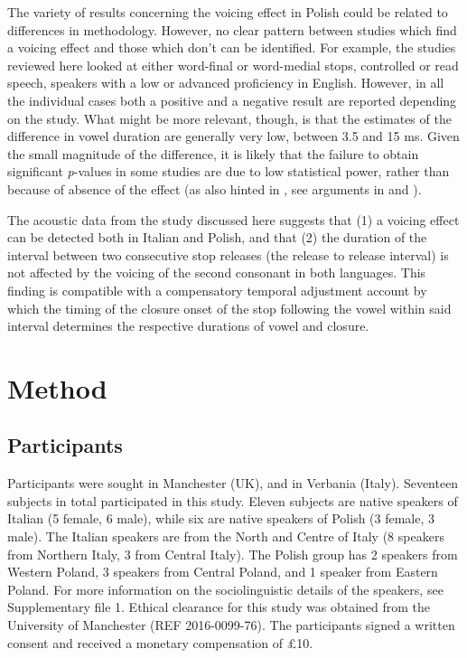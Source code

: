 \documentclass[charis]{glossa}
\begin{document}
The variety of results concerning the voicing effect in Polish could be
related to differences in methodology. However, no clear pattern between
studies which find a voicing effect and those which don't can be
identified. For example, the studies reviewed here looked at either
word-final or word-medial stops, controlled or read speech, speakers
with a low or advanced proficiency in English. However, in all the
individual cases both a positive and a negative result are reported
depending on the study. What might be more relevant, though, is that the
estimates of the difference in vowel duration are generally very low,
between 3.5 and 15 ms. Given the small magnitude of the difference, it
is likely that the failure to obtain significant \emph{p}-values in some
studies are due to low statistical power, rather than because of absence
of the effect (as also hinted in \citealt{begus2017}, see arguments in
\citealt{roettger2019} and \citealt{nicenboim2018a}).

The acoustic data from the study discussed here suggests that (1) a
voicing effect can be detected both in Italian and Polish, and that (2)
the duration of the interval between two consecutive stop releases (the
release to release interval) is not affected by the voicing of the
second consonant in both languages. This finding is compatible with a
compensatory temporal adjustment account by which the timing of the
closure onset of the stop following the vowel within said interval
determines the respective durations of vowel and closure.

\hypertarget{method}{%
\section{Method}\label{method}}

\label{s:method}

\hypertarget{participants}{%
\subsection{Participants}\label{participants}}

Participants were sought in Manchester (UK), and in Verbania (Italy).
Seventeen subjects in total participated in this study. Eleven subjects
are native speakers of Italian (5 female, 6 male), while six are native
speakers of Polish (3 female, 3 male). The Italian speakers are from the
North and Centre of Italy (8 speakers from Northern Italy, 3 from
Central Italy). The Polish group has 2 speakers from Western Poland, 3
speakers from Central Poland, and 1 speaker from Eastern Poland. For
more information on the sociolinguistic details of the speakers, see
Supplementary file 1. Ethical clearance for this study was obtained from
the University of Manchester (REF 2016-0099-76). The participants signed
a written consent and received a monetary compensation of £10.
\end{document}
